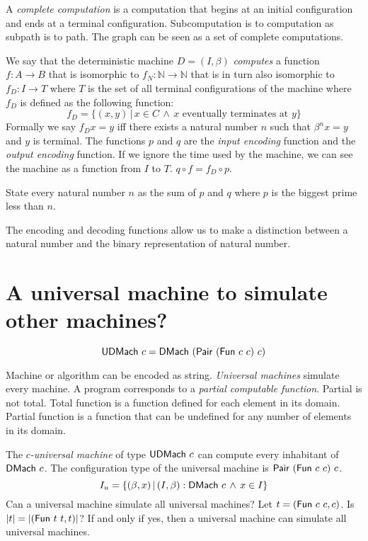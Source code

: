 A \emph{complete computation} is a computation that begins at an initial configuration
and ends at a terminal configuration.
Subcomputation is to computation as subpath is to path.
The graph can be seen as a set of complete computations.

We say that the deterministic machine $D = (I,\beta)$ \emph{computes} a function
$f : A \to B$
that is isomorphic to
$f_N : \mathbb{N} \to \mathbb{N}$
that is in turn also isomorphic to
$f_D : I \to T$
where $T$ is the set of all terminal configurations of the machine
where $f_D$ is defined as the following function:
\begin{equation}
    f_D = \{ (x,y) \,|\, x \in C \,\wedge\, x \text{ eventually terminates at } y \}
\end{equation}
Formally we say $f_D x = y$ iff there exists
a natural number $n$ such that $\beta^n x = y$ and $y$ is terminal.
The functions $p$ and $q$ are the \emph{input encoding} function
and the \emph{output encoding} function.
If we ignore the time used by the machine,
we can see the machine as a function from $I$ to $T$.
$q \circ f = f_D \circ p$.

State every natural number $n$ as the sum of $p$ and $q$
where $p$ is the biggest prime less than $n$.

The encoding and decoding functions allow us to make
a distinction between a natural number
and the binary representation of natural number.

\section{A universal machine to simulate other machines?}

\[
    \mathsf{UDMach}~c = \mathsf{DMach}~(\mathsf{Pair}~(\mathsf{Fun}~c~c)~c)
\]

Machine or algorithm can be encoded as string.
\emph{Universal machines} simulate every machine.
A program corresponds to a \emph{partial computable function}.
Partial is not total.
Total function is a function defined for each element in its domain.
Partial function is a function that can be undefined for any number of elements in its domain.

The \emph{$c$-universal machine} of type $\mathsf{UDMach}~c$ can compute every inhabitant of $\mathsf{DMach}~c$.
The configuration type of the universal machine is $\mathsf{Pair}~(\mathsf{Fun}~c~c)~c$.
\[
    I_u = \{ (\beta,x) \,|\, (I,\beta) : \mathsf{DMach}~c \,\wedge\, x \in I \}
\]
Can a universal machine simulate all universal machines?
Let $t = (\mathsf{Fun}~c~c,c)$.
Is $|t| = |(\mathsf{Fun}~t~t,t)|$?
If and only if yes, then a universal machine can simulate all universal machines.

